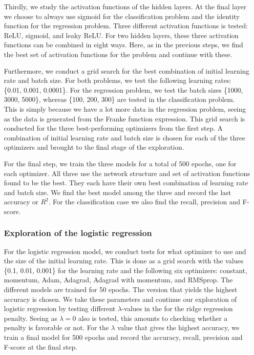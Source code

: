 Thirdly, we study the activation functions of the hidden layers. At the final layer we choose to always use sigmoid for the classification problem and the identity function for the regression problem. 
Three different activation functions is tested: ReLU, sigmoid, and leaky ReLU. For two hidden layers, these three activation functions can be combined in eight ways. Here, as in the previous steps, we find the best set of activation functions for the problem and continue with these. 

Furthermore, we conduct a grid search for the best combination of initial learning rate and batch size. For both problems, we test the following learning rates: \{0.01, 0.001, 0.0001\}. 
For the regression problem, we test the batch sizes \{1000, 3000, 5000\}, whereas \{100, 200, 300\} are tested in the classification problem. 
This is simply because we have a lot more data in the regression problem, seeing as the data is generated from the Franke function expression. This grid search is conducted for the three best-performing optimizers from the first step. 
A combination of initial learning rate and batch size is chosen for each of the three optimizers and brought to the final stage of the exploration. 

For the final step, we train the three models for a total of 500 epochs, one for each optimizer. All three use the network structure and set of activation functions found to be the best. They each have their own best combination of learning rate and batch size. 
We find the best model among the three and record the last accuracy or $R^2$. For the classification case we also find the recall, precision and F-score. 

\subsubsection{Exploration of the logistic regression}

For the logistic regression model, we conduct tests for what optimizer to use and the size of the initial learning rate. 
This is done as a grid search with the values \{0.1, 0.01, 0.001\} for the learning rate and the following six optimizers: constant, momentum, Adam, Adagrad, Adagrad with momentum, and RMSprop. 
The different models are trained for 50 epochs. 
The version that yields the highest accuracy is chosen. 
We take these parameters and continue our exploration of logistic regression by testing different $\lambda$-values in the for the ridge regression penalty. Seeing as $\lambda = 0$ also is tested, this amounts to checking whether a penalty is favorable or not. 
For the $\lambda$ value that gives the highest accuracy, we train a final model for 500 epochs and record the accuracy, recall, precision and F-score at the final step. 